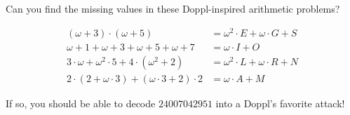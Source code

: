 
Can you find the missing values in these Doppl-inspired arithmetic problems?

\begin{align*}
  (\omega+3)\cdot(\omega+5)&=\omega^2\cdot E+\omega\cdot G+S \\
  \omega+1+\omega+3+\omega+5+\omega+7&=\omega\cdot I+O \\
  3\cdot\omega+\omega^2\cdot 5+4\cdot(\omega^2+2)&=
        \omega^2\cdot L+\omega\cdot R+N \\
  2\cdot(2+\omega\cdot3)+(\omega\cdot3+2)\cdot2&=
        \omega\cdot A+M
\end{align*}

If so, you should be able to decode \(24007042951\) into a Doppl's
favorite \mappMobimon{} attack! %

